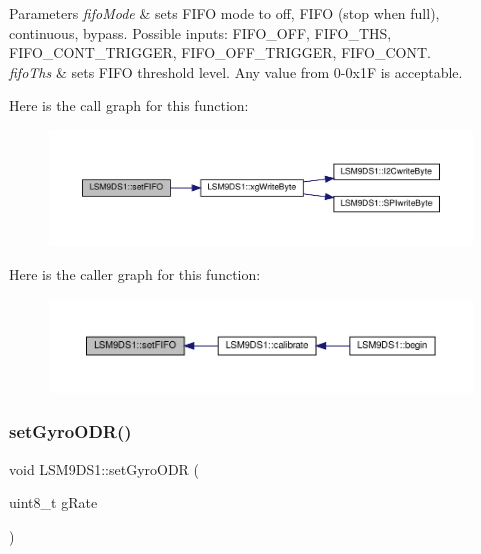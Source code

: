 \begin{DoxyParams}{Parameters}
{\em fifo\+Mode} & sets F\+I\+FO mode to off, F\+I\+FO (stop when full), continuous, bypass. Possible inputs\+: F\+I\+F\+O\+\_\+\+O\+FF, F\+I\+F\+O\+\_\+\+T\+HS, F\+I\+F\+O\+\_\+\+C\+O\+N\+T\+\_\+\+T\+R\+I\+G\+G\+ER, F\+I\+F\+O\+\_\+\+O\+F\+F\+\_\+\+T\+R\+I\+G\+G\+ER, F\+I\+F\+O\+\_\+\+C\+O\+NT. \\
\hline
{\em fifo\+Ths} & sets F\+I\+FO threshold level. Any value from 0-\/0x1F is acceptable. \\
\hline
\end{DoxyParams}
Here is the call graph for this function\+:
\nopagebreak
\begin{figure}[H]
\begin{center}
\leavevmode
\includegraphics[width=350pt]{classLSM9DS1_a0ec4a93a34545af1acc336bae9b360f1_cgraph}
\end{center}
\end{figure}
Here is the caller graph for this function\+:
\nopagebreak
\begin{figure}[H]
\begin{center}
\leavevmode
\includegraphics[width=350pt]{classLSM9DS1_a0ec4a93a34545af1acc336bae9b360f1_icgraph}
\end{center}
\end{figure}
\mbox{\label{classLSM9DS1_ab8fc33c8da4fc5c379e880ff57d331fa}} 
\subsubsection{\texorpdfstring{set\+Gyro\+O\+D\+R()}{setGyroODR()}}
{\footnotesize\ttfamily void L\+S\+M9\+D\+S1\+::set\+Gyro\+O\+DR (\begin{DoxyParamCaption}\item[{uint8\+\_\+t}]{g\+Rate }\end{DoxyParamCaption})}



